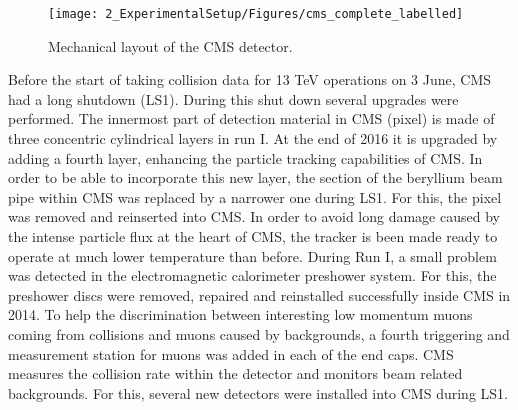 \begin{figure}[ht]
	\centering
	\texttt{[image: 2\_ExperimentalSetup/Figures/cms\_complete\_labelled]}
	\caption{Mechanical layout of the CMS detector\cite{CMSdraw}.}
	\label{fig:CMS}
\end{figure}

Before the start of taking collision data for 13 \si{ \TeV} operations on 3 June, CMS had a long shutdown (LS1)\cite{Pralavorio:2024977}. During this shut down several upgrades were performed. The innermost part of detection material in CMS (pixel) is made of three concentric cylindrical layers in run I. At the end of 2016 it is upgraded by adding a fourth layer, enhancing the particle tracking capabilities of CMS. In order to be able to incorporate this new layer, the section of the beryllium beam pipe within CMS was replaced by a narrower one during LS1. For this, the pixel was removed and reinserted into CMS.  In order to avoid long damage caused by the intense particle flux at the heart of CMS, the tracker is been made ready to operate at much lower temperature than before. During Run I, a small problem was detected in the electromagnetic calorimeter preshower system. For this, the preshower discs were removed, repaired and reinstalled successfully inside CMS in 2014. To help the discrimination between interesting low momentum muons coming from collisions and muons caused by backgrounds, a fourth triggering and measurement station for muons was added in each of the end caps.  CMS measures the collision rate within the detector and monitors beam related backgrounds. For this, several new detectors were installed into CMS during LS1. 


\newpage
